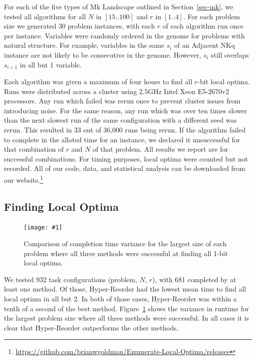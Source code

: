 \documentclass[runningheads,a4paper]{llncs}
\newcommand{\includegraphicsfit}[1]
{\texttt{[image: \#1]}}
\begin{document}
For each of the five types of Mk Landscape outlined in Section~\ref{sec-mk}, we tested all
algorithms for all $N$ in $[15..100]$ and $r$ in $[1..4]$. For each problem size we generated
30 problem instances, with each $r$ of each algorithm run once per instance. Variables were randomly
ordered in the genome for problems with natural structure. For example, variables in the same $s_i$
of an Adjacent NKq instance are not likely to be consecutive in the genome. However, $s_i$ still overlaps
$s_{i+1}$ in all but 1 variable.

Each algorithm was given a maximum of four hours to find all $r$-bit local optima.
Runs were distributed across a cluster using 2.5GHz Intel Xeon E5-2670v2 processors.
Any run which failed was rerun once to prevent cluster issues from introducing
noise. For the same reason, any run which was over ten times slower than the next slowest run of the
same configuration with a different seed was rerun. This resulted in 33 out of 36,000 runs being rerun.
If the algorithm failed to complete in the alloted time for an instance,
we declared it unsuccessful for that combination of $r$ and $N$ of that problem. All results
we report are for successful combinations. For timing purposes, local optima were counted but not
recorded. All of our code, data, and statistical analysis can be downloaded from our
website.\footnote{\url{https://github.com/brianwgoldman/Enumerate-Local-Optima/releases}}

\subsection{Finding Local Optima}
\label{sec-1-bit-optima}

\begin{figure}
  \centering
  \includegraphicsfit{boxplot-method}
  \caption{Comparison of completion time variance for the largest size of each problem
           where all three methods were successful at finding all 1-bit local optima.}
  \label{fig-boxplot-method}
\end{figure}



We tested 932 task configurations (problem, $N$, $r$), with 681 completed by at least one method.
Of those, Hyper-Reorder had the lowest
mean time to find all local optima in all but 2. In both of those cases, Hyper-Reorder was within a tenth of a second
of the best method.
Figure~\ref{fig-boxplot-method} shows the variance in runtime for the largest problem size where all three methods
were successful. In all cases it is clear that Hyper-Reorder outperforms the other methods.
\end{document}
